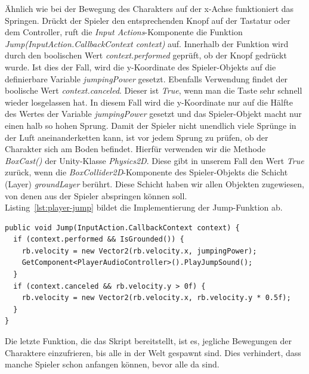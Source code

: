 Ähnlich wie bei der Bewegung des Charakters auf der x-Achse funktioniert das Springen. Drückt der Spieler den entsprechenden Knopf auf der Tastatur oder dem Controller, ruft die \textit{Input Actions}-Komponente die Funktion \textit{Jump(InputAction.CallbackContext context)} auf. Innerhalb der Funktion wird durch den boolischen Wert \textit{context.performed} geprüft, ob der Knopf gedrückt wurde. Ist dies der Fall, wird die y-Koordinate des Spieler-Objekts auf die definierbare Variable \textit{jumpingPower} gesetzt. Ebenfalls Verwendung findet der boolische Wert \textit{context.canceled}. Dieser ist \textit{True}, wenn man die Taste sehr schnell wieder losgelassen hat. In diesem Fall wird die y-Koordinate nur auf die Hälfte des Wertes der Variable \textit{jumpingPower} gesetzt und das Spieler-Objekt macht nur einen halb so hohen Sprung. Damit der Spieler nicht unendlich viele Sprünge in der Luft aneinanderketten kann, ist vor jedem Sprung zu prüfen, ob der Charakter sich am Boden befindet. Hierfür verwenden wir die Methode \textit{BoxCast()} der Unity-Klasse \textit{Physics2D}. Diese gibt in unserem Fall den Wert \textit{True} zurück, wenn die \textit{BoxCollider2D}-Komponente des Spieler-Objekts die Schicht (Layer) \textit{groundLayer} berührt. Diese Schicht haben wir allen Objekten zugewiesen, von denen aus der Spieler abspringen können soll.\\

Listing~\ref{lst:player-jump} bildet die Implementierung der Jump-Funktion ab.\\

\begin{lstlisting}[caption={Funktion zur Durchführung eines Sprungs des Spielers},captionpos=b,label=lst:player-jump]
public void Jump(InputAction.CallbackContext context) {
  if (context.performed && IsGrounded()) {
    rb.velocity = new Vector2(rb.velocity.x, jumpingPower);
    GetComponent<PlayerAudioController>().PlayJumpSound();
  }
  if (context.canceled && rb.velocity.y > 0f) {
    rb.velocity = new Vector2(rb.velocity.x, rb.velocity.y * 0.5f);
  }
}
\end{lstlisting}

Die letzte Funktion, die das Skript bereitstellt, ist es, jegliche Bewegungen der Charaktere einzufrieren, bis alle in der Welt gespawnt sind. Dies verhindert, dass manche Spieler schon anfangen können, bevor alle da sind. 

